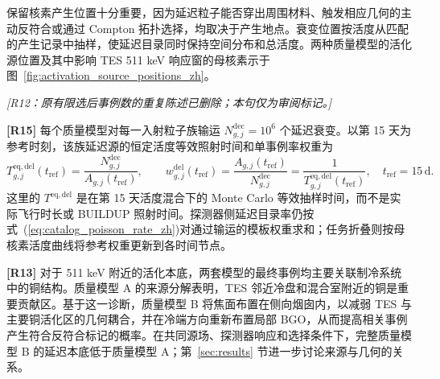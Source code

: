 \documentclass[11pt]{article}
\newcommand{\revdeleted}[1]{\par\noindent\textcolor{revisionblue}{\small\itshape [#1]}\par}
\begin{document}
保留核素产生位置十分重要，因为延迟粒子能否穿出周围材料、触发相应几何的主动反符合或通过 Compton 拓扑选择，均取决于产生地点。衰变位置按活度从匹配的产生记录中抽样，使延迟目录同时保持空间分布和总活度。两种质量模型的活化源位置及其中影响 TES 511 keV 响应窗的母核素示于图~\ref{fig:activation_source_positions_zh}。
\endgroup

\revdeleted{R12：原有限选后事例数的重复陈述已删除；本句仅为审阅标记。}

\begingroup
\color{revisionblue}
\noindent\textbf{[R15]} 每个质量模型对每一入射粒子族输运 $N^{\mathrm{dec}}_{g,j}=10^6$ 个延迟衰变。以第 15 天为参考时刻，该族延迟源的恒定活度等效照射时间和单事例率权重为
\begin{equation}
 T^{\mathrm{eq,del}}_{g,j}(t_{\mathrm{ref}})
 =\frac{N^{\mathrm{dec}}_{g,j}}{A_{g,j}(t_{\mathrm{ref}})},
 \qquad
 w^{\mathrm{del}}_{g,j}(t_{\mathrm{ref}})
 =\frac{A_{g,j}(t_{\mathrm{ref}})}{N^{\mathrm{dec}}_{g,j}}
 =\frac{1}{T^{\mathrm{eq,del}}_{g,j}(t_{\mathrm{ref}})},
 \quad t_{\mathrm{ref}}=15\,\mathrm{d}.
 \label{eq:delayed_equivalent_exposure_zh}
\end{equation}
这里的 $T^{\mathrm{eq,del}}$ 是在第 15 天活度混合下的 Monte Carlo 等效抽样时间，而不是实际飞行时长或 BUILDUP 照射时间。探测器侧延迟目录率仍按式~(\ref{eq:catalog_poisson_rate_zh})对通过输运的模板权重求和；任务折叠则按母核素活度曲线将参考权重更新到各时间节点。
\endgroup

\begingroup
\color{revisionblue}
\noindent\textbf{[R13]} 对于 511 keV 附近的活化本底，两套模型的最终事例均主要关联制冷系统中的铜结构。质量模型 A 的来源分解表明，TES 邻近冷盘和混合室附近的铜是重要贡献区。基于这一诊断，质量模型 B 将焦面布置在侧向烟囱内，以减弱 TES 与主要铜活化区的几何耦合，并在冷端方向重新布置局部 BGO，从而提高相关事例产生符合反符合标记的概率。在共同源场、探测器响应和选择条件下，完整质量模型 B 的延迟本底低于质量模型 A；第~\ref{sec:results} 节进一步讨论来源与几何的关系。
\endgroup
\end{document}
